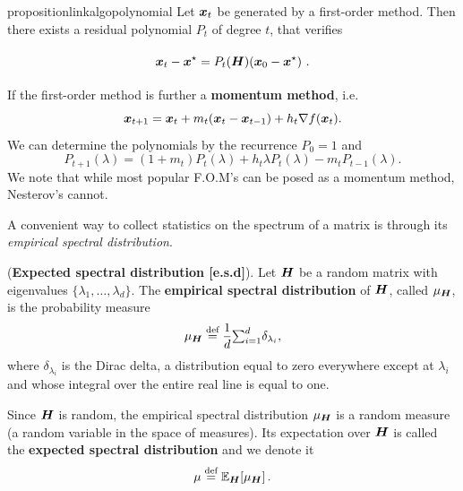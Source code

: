 \documentclass{article}
\begin{document}
\begin{restatable}{proposition}{linkalgopolynomial}
    \label{prop:link_algo_polynomial} \citep{hestenes1952methods}
    Let ${\boldsymbol x}_t$ be generated by a first-order method. Then there exists a residual polynomial $P_t$ of degree $t$, that verifies
    \begin{equation}\label{eq:polynomial_iterates}
        \vphantom{\sum^n}{\boldsymbol x}_{t}-{\boldsymbol x}^\star = P_t({\boldsymbol H})({\boldsymbol x}_0-{\boldsymbol x}^\star)~.
    \end{equation}
\end{restatable}

\begin{remark} \label{rmk: momentum based}
If the first-order method is further a \textbf{momentum method}, i.e.
$$
    {\boldsymbol x}_{t+1}={\boldsymbol x}_t+m_t({\boldsymbol x}_t-{\boldsymbol x}_{t-1})+h_t\nabla f({\boldsymbol x}_t) .
$$
We can determine the polynomials by the recurrence $P_0=1$ and
    \begin{equation*}
        P_{t+1}(\lambda)=(1+m_t)P_t(\lambda)+h_t\lambda P_t(\lambda)-m_tP_{t-1}(\lambda) .
    \end{equation*}
We note that while most popular F.O.M's can be posed as a momentum method, Nesterov's cannot.
\end{remark}






A convenient way to collect statistics on the spectrum of a matrix is through its \emph{empirical spectral distribution}.


\begin{definition}
(\textbf{Expected spectral distribution [e.s.d]}). 
Let ${\boldsymbol H}$ be a random matrix with eigenvalues $\{\lambda_1, \ldots, \lambda_d\}$. The \textbf{empirical spectral distribution} of ${\boldsymbol H}$, called ${\mu}_{{\boldsymbol H}}$, is the probability measure
\begin{equation}\label{eq:wighted_spectral_density}
    \mu_{{\boldsymbol H}} \stackrel{\text{def}}{=} \frac{1}{d}{\textstyle{\sum_{i=1}^d}} \delta_{\lambda_i},
\end{equation}
where $\delta_{\lambda_i}$ is the Dirac delta, a distribution equal to zero everywhere except at $\lambda_i$ and whose integral over the entire real line is equal to one.

Since ${\boldsymbol H}$ is random, the empirical spectral distribution $\mu_{\boldsymbol H}$ is a random measure (a random variable in the space of measures). Its expectation over ${\boldsymbol H}$ is called the \textbf{expected spectral distribution} and we denote it
\begin{equation}
\mu \stackrel{\text{def}}{=} {\mathbb{E}}_{{\boldsymbol H}}[\mu_{{\boldsymbol H}}]\,.
\end{equation}
\end{definition}
\end{document}
